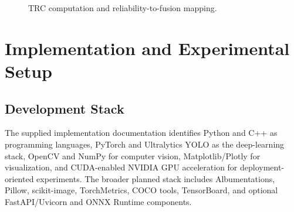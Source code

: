 \documentclass[conference]{IEEEtran}
\begin{document}
\begin{figure}[!t]
\centering
{}
\caption{TRC computation and reliability-to-fusion mapping.}
\label{fig:trcflow}
\end{figure}


\section{Implementation and Experimental Setup}

\subsection{Development Stack}

The supplied implementation documentation identifies Python and C++ as programming languages, PyTorch and Ultralytics YOLO as the deep-learning stack, OpenCV and NumPy for computer vision, Matplotlib/Plotly for visualization, and CUDA-enabled NVIDIA GPU acceleration for deployment-oriented experiments. The broader planned stack includes Albumentations, Pillow, scikit-image, TorchMetrics, COCO tools, TensorBoard, and optional FastAPI/Uvicorn and ONNX Runtime components.
\end{document}
